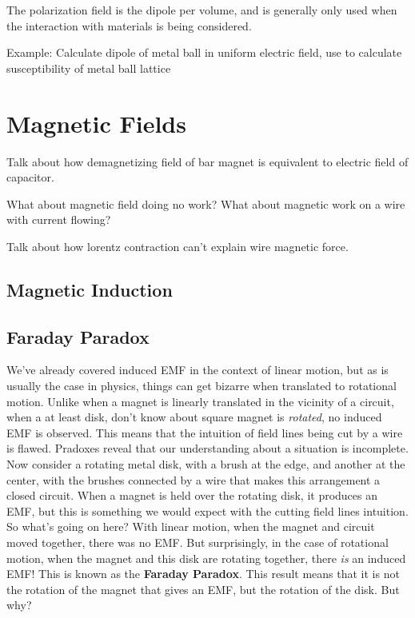 \documentclass[12pt]{book}
\begin{document}
The polarization field is the dipole per volume, and is generally only used when the interaction with materials is being considered.

Example: Calculate dipole of metal ball in uniform electric field, use to calculate susceptibility of metal ball lattice


\chapter{Magnetic Fields}
Talk about how demagnetizing field of bar magnet is equivalent to electric field of capacitor.

What about magnetic field doing no work? What about magnetic work on a wire with current flowing?

Talk about how lorentz contraction can't explain wire magnetic force.

\section{Magnetic Induction}

\section{Faraday Paradox}

We've already covered induced EMF in the context of linear motion, but as is usually the case in physics, things can get bizarre when translated to rotational motion.
Unlike when a magnet is linearly translated in the vicinity of a circuit, when a {\color{red} at least disk, don't know about square} magnet is \textit{rotated}, no induced EMF is observed.
This means that the intuition of field lines being cut by a wire is flawed. Pradoxes reveal that our understanding about a situation is incomplete.
Now consider a rotating metal disk, with a brush at the edge, and another at the center, with the brushes connected by a wire that makes this arrangement a closed circuit.
When a magnet is held over the rotating disk, it produces an EMF, but this is something we would expect with the cutting field lines intuition. So what's going on here?
With linear motion, when the magnet and circuit moved together, there was no EMF.
But surprisingly, in the case of rotational motion, when the magnet and this disk are rotating together, there \textit{is} an induced EMF!
This is known as the \textbf{Faraday Paradox}.
This result means that it is not the rotation of the magnet that gives an EMF, but the rotation of the disk. But why?
\end{document}
